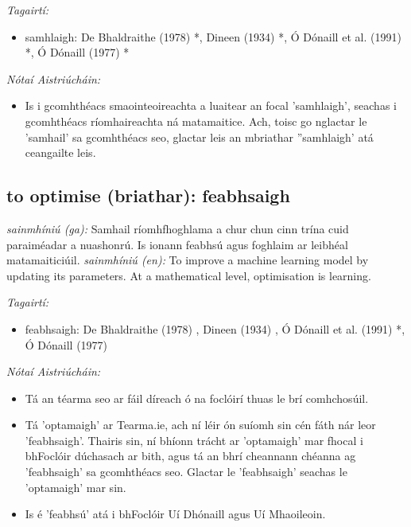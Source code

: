 \documentclass{article}
\begin{document}
 \noindent \textit{Tagairtí:}
\begin{itemize}
	\item samhlaigh: De Bhaldraithe (1978) \cite{de-bhaldraithe}*, Dineen (1934) \cite{dineen}*, Ó Dónaill et al. (1991) \cite{focloir-beag}*, Ó Dónaill (1977) \cite{odonaill}*
\end{itemize}

 \noindent \textit{Nótaí Aistriúcháin:}
\begin{itemize}
	\item Is i gcomhthéacs smaointeoireachta a luaitear an focal 'samhlaigh', seachas i gcomhthéacs ríomhaireachta ná matamaitice. Ach, toisc go nglactar le 'samhail' sa gcomhthéacs seo, glactar leis an mbriathar ''samhlaigh' atá ceangailte leis.
\end{itemize}


\subsection*{to optimise (briathar): feabhsaigh} 
 \noindent \textit{sainmhíniú (ga):} Samhail ríomhfhoghlama a chur chun cinn trína cuid paraiméadar a nuashonrú. Is ionann feabhsú agus foghlaim ar leibhéal matamaiticiúil.
\newline\newline
 \noindent \textit{sainmhíniú (en):} To improve a machine learning model by updating its parameters. At a mathematical level, optimisation is learning.
\newline

 \noindent \textit{Tagairtí:}
\begin{itemize}
	\item feabhsaigh: De Bhaldraithe (1978) \cite{de-bhaldraithe}, Dineen (1934) \cite{dineen}, Ó Dónaill et al. (1991) \cite{focloir-beag}*, Ó Dónaill (1977) \cite{odonaill}
\end{itemize}

 \noindent \textit{Nótaí Aistriúcháin:}
\begin{itemize}
	\item Tá an téarma seo ar fáil díreach ó na foclóirí thuas le brí comhchosúil.
	\item Tá 'optamaigh' ar Tearma.ie, ach ní léir ón suíomh sin cén fáth nár leor 'feabhsaigh'. Thairis sin, ní bhíonn trácht ar 'optamaigh' mar fhocal i bhFoclóir dúchasach ar bith, agus tá an bhrí cheannann chéanna ag 'feabhsaigh' sa gcomhthéacs seo. Glactar le 'feabhsaigh' seachas le 'optamaigh' mar sin.
	\item Is é 'feabhsú' atá i bhFoclóir Uí Dhónaill agus Uí Mhaoileoin.
\end{itemize}
\end{document}
